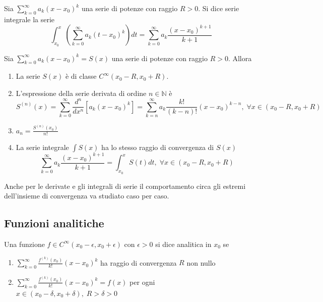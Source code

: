             \begin{definition}
                Sia $\sum_{k = 0}^{\infty} a_{k}(x - x_{0})^{k}$ una serie di potenze con raggio $R > 0$.
                Si dice serie integrale la serie
                \[
                    \int_{x_{0}}^{x} \left( \sum_{k = 0}^{\infty} a_{k}(t - x_{0})^{k} \right) dt = \sum_{k = 0}^{\infty} a_{k}\frac{(x - x_{0})^{k + 1}}{k + 1}
                \]
            \end{definition}

            \begin{theorem}
                Sia $\sum_{k = 0}^{\infty} a_{k}(x - x_{0})^{k} = S(x)$ una serie di potenze con raggio $R > 0$.
                Allora
                \begin{enumerate}[label=(\arabic*)]
                    \item La serie $S(x)$ è di classe $C^{\infty}(x_{0} - R, x_{0} + R)$.
                    \item L'espressione della serie derivata di ordine $n \in \mathbb{N}$ è
                    \[
                        S^{(n)}(x) = \sum_{k = 0}^{\infty} \frac{d^{n}}{dx^{n}} \left[ a_{k}(x - x_{0})^{k} \right] = \sum_{k = n}^{\infty} a_{k} \frac{k!}{(k-n)!}(x - x_{0})^{k - n} , \; \forall x \in (x_{0} - R, x_{0} + R)
                    \]
                    \item $\displaystyle a_{n} = \frac{S^{(n)}(x_{0})}{n!}$
                    \item La serie integrale $\int S(x)$ ha lo stesso raggio di convergenza di $S(x)$
                    \[
                        \sum_{k = 0}^{\infty} a_{k}\frac{(x - x_{0})^{k + 1}}{k + 1} = \int_{x_{0}}^{x} S(t) dt, \; \forall x \in (x_{0} - R, x_{0} + R)
                    \]
                \end{enumerate}
            \end{theorem}
            Anche per le derivate e gli integrali di serie il comportamento circa gli estremi dell'insieme di convergenza va studiato caso per caso.



        \subsection{Funzioni analitiche}
        Una funzione $f \in C^{\infty}(x_{0} - \epsilon, x_{0} + \epsilon)$ con $\epsilon > 0$ si dice analitica in $x_{0}$ se
        \begin{enumerate}[label=(\arabic*)]
            \item $\displaystyle \sum_{k = 0}^{\infty} \frac{f^{(k)}(x_{0})}{k!}(x - x_{0})^{k}$ ha raggio di convergenza $R$ non nullo
            \item $\displaystyle \sum_{k = 0}^{\infty} \frac{f^{(k)}(x_{0})}{k!}(x - x_{0})^{k} = f(x)$ per ogni $x \in (x_{0} - \delta, x_{0} + \delta), \; R > \delta > 0$
        \end{enumerate}

